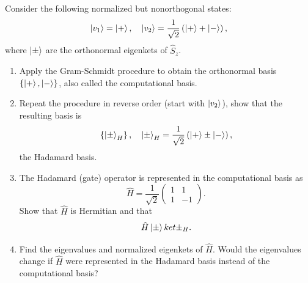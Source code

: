 \documentclass[12pt]{article}
\newenvironment{problem}[2][Problem]{\begin{trivlist}
    \item[\hskip \labelsep {\bfseries #1}\hskip \labelsep {\bfseries #2.}]}{\end{trivlist}}
\theoremstyle{definition}
\begin{document}
\begin{problem}{6}
  Consider the following normalized but nonorthogonal states:
  \begin{equation}
  \label{eq:8}
  \ket{v_1} = \ket{+}, \quad \ket{v_2} = \frac{1}{\sqrt{2}} \left( \ket{+} + \ket{-} \right),
  \end{equation}
  where \( \ket{\pm} \) are the orthonormal eigenkets of \( \hat{S}_z \).

  \begin{enumerate}[label=(\alph*)]
          \item Apply the Gram-Schmidt procedure to obtain the orthonormal basis \( \left\{ \ket{+}, \ket{-} \right\} \), also called the computational basis.
    \item Repeat the procedure in reverse order (start with \( \ket{v_2} \)), show that the resulting basis is
          \begin{equation}
          \label{eq:9}
          \left\{ \ket{\pm}_H \right\}, \quad \ket{\pm}_H = \frac{1}{\sqrt{2}} \left( \ket{+} \pm \ket{-} \right),
          \end{equation}
          the Hadamard basis.
    \item The Hadamard (gate) operator is represented in the computational basis as
          \begin{equation}
          \label{eq:10}
          \hat{H} = \frac{1}{\sqrt{2}} \begin{pmatrix}
1  & 1 \\
1  & -1
 \end{pmatrix}.
          \end{equation}
          Show that \( \hat{H} \) is Hermitian and that
          \begin{equation}
          \label{eq:11}
          \hat{H}\ket{\pm}ket{\pm}_H.
          \end{equation}

          \item Find the eigenvalues and normalized eigenkets of \( \hat{H} \). Would the eigenvalues change if \( \hat{H} \) were represented in the Hadamard basis instead of the computational basis?
  \end{enumerate}
\end{problem}
\end{document}
